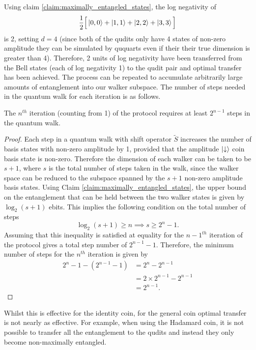Using claim \ref{claim:maximally_entangled_states}, the log negativity of
\begin{equation}
    \frac{1}{2}\Big[\ket{0,0} + \ket{1,1} + \ket{2,2} + \ket{3,3}\Big ]
\end{equation}
is 2, setting $d=4$ (since both of the qudits only have 4 states of non-zero amplitude they can be simulated by ququarts even if their their true dimension is greater than 4).
Therefore, 2 units of log negativity have been transferred from the Bell states (each of log negativity 1) to the qudit pair and optimal transfer has been achieved.
The process can be repeated to accumulate arbitrarily large amounts of entanglement into our walker subspace.
The number of steps needed in the quantum walk for each iteration is as follows.
\begin{claim}
\label{claim:min_steps}
The $n^{th}$ iteration (counting from 1) of the protocol requires at least $2^{n-1}$ steps in the quantum walk.
\end{claim}
\begin{proof}
Each step in a quantum walk with shift operator $\tilde{S}$ increases the number of basis states with non-zero amplitude by 1, provided that the amplitude $\ket{\downarrow}$ coin basis state is non-zero.
Therefore the dimension of each walker can be taken to be $s + 1$, where $s$ is the total number of steps taken in the walk, since the walker space can be reduced to the subspace spanned by the $s+1$ non-zero amplitude basis states.
Using Claim \ref{claim:maximally_entangled_states}, the upper bound on the entanglement that can be held between the two walker states is given by $\log_2(s+1)$ ebits.
This implies the following condition on the total number of steps
\begin{equation}
    \log_2(s+1) \geq n \implies s\geq 2^n -1.
\end{equation}
Assuming that this inequality is satisfied at equality for the $n-1^{th}$ iteration of the protocol gives a total step number of $2^{n-1} -1$.
Therefore, the minimum number of steps for the $n^{th}$ iteration is given by
\begin{align}
    2^{n} - 1 - (2^{n-1} -1) &= 2^n - 2^{n-1}\\
    &= 2 \times 2^{n-1} - 2^{n-1}\\
    &= 2^{n-1}.
\end{align}
\end{proof}
Whilst this is effective for the identity coin, for the general coin optimal transfer is not nearly as effective.
For example, when using the Hadamard coin, it is not possible to transfer all the entanglement to the qudits and instead they only become non-maximally entangled.

